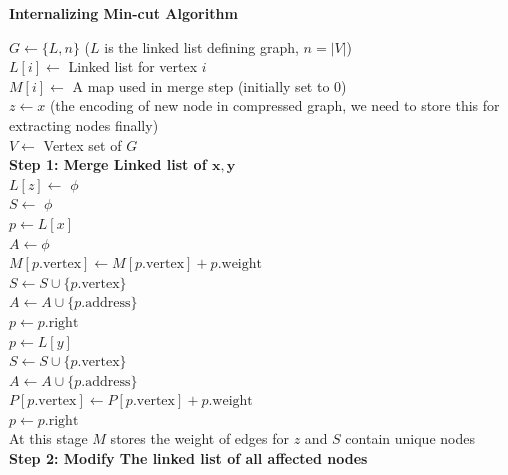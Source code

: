 \documentclass[a4paper]{article}
\begin{document}
\begin{question}
\textbf{Internalizing Min-cut Algorithm}
\end{question}
\begin{algorithm}[H]
\SetAlgoLined
{}
    $G \leftarrow \{L, n \}$ ($L$ is the linked list defining graph, $n = |V|$) \\
  $L[i] \leftarrow$ Linked list for vertex $i$ \\
  $M[i] \leftarrow$ A map used in merge step (initially set to $0$)\\
  $z \leftarrow x$ (the encoding of new node in compressed graph, we need to store this for extracting nodes finally) \\
  $V \leftarrow$ Vertex set of $G$ \\
  \textbf{Step 1: Merge Linked list of $\mathbf{x, y}$} \\
  $L[z] \leftarrow$ $\phi$ \\
  $S \leftarrow$ $\phi$ \\
  $p \leftarrow L[x]$ \\
  $A \leftarrow \phi$\\
   {
    $M[p.\text{vertex}] \leftarrow M[p.\text{vertex}] + p.\text{weight}$ \\
    $S \leftarrow S \cup \{ p.\text{vertex} \}$ \\
    $A \leftarrow A \cup \{ p.\text{address} \}$ \\
    $p \leftarrow p.\text{right}$ \\
  }
  $p \leftarrow L[y]$ \\
   {
     {
      $S \leftarrow S \cup \{ p.\text{vertex} \}$ \\
    }
    $A \leftarrow A \cup \{ p.\text{address} \}$ \\
    $P[p.\text{vertex}] \leftarrow P[p.\text{vertex}] + p.\text{weight}$ \\
    $p \leftarrow p.\text{right}$ \\
  }
  At this stage $M$ stores the weight of edges for $z$ and $S$ contain unique nodes \\
  \textbf{Step 2: Modify The linked list of all affected nodes} \\

\end{algorithm}
\end{document}
